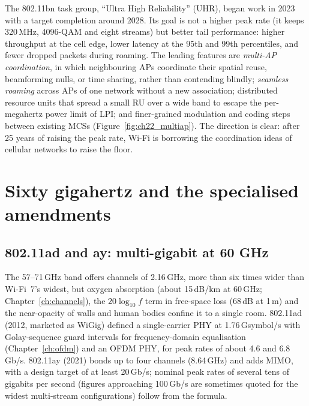 The 802.11bn task group, ``Ultra High Reliability'' (UHR), began work in 2023 with a target
completion around 2028. Its goal is not a higher peak rate (it keeps 320\,MHz, 4096-QAM and eight
streams) but better tail performance: higher throughput at the cell edge, lower latency at the 95th
and 99th percentiles, and fewer dropped packets during roaming. The leading features are
\emph{multi-AP coordination}, in which neighbouring APs coordinate their spatial reuse, beamforming
nulls, or time sharing, rather than contending blindly; \emph{seamless roaming} across APs of one
network without a new association; distributed resource units that spread a small RU over a wide
band to escape the per-megahertz power limit of LPI; and finer-grained modulation and coding steps
between existing MCSs (Figure~\ref{fig:ch22_multiap}). The direction is clear: after 25 years of raising the peak rate, Wi-Fi is
borrowing the coordination ideas of cellular networks to raise the floor.

\section{Sixty gigahertz and the specialised amendments}
\label{sec:ch22:special}

\subsection{802.11ad and ay: multi-gigabit at 60 GHz}

The 57--71\,GHz band offers channels of 2.16\,GHz, more than six times wider than Wi-Fi~7's widest,
but oxygen absorption (about 15\,dB/km at 60\,GHz; Chapter~\ref{ch:channels}), the $20\log_{10}f$
term in free-space loss (68\,dB at 1\,m) and the near-opacity of walls and human bodies confine it
to a single room. 802.11ad (2012, marketed as WiGig) defined a single-carrier PHY at
1.76\,Gsymbol/s with Golay-sequence guard intervals for frequency-domain equalisation
(Chapter~\ref{ch:ofdm}) and an OFDM PHY, for peak rates of about 4.6 and 6.8\,Gb/s. 802.11ay (2021)
bonds up to four channels (8.64\,GHz) and adds MIMO, with a design target of at least 20\,Gb/s;
nominal peak rates of several tens of gigabits per second (figures approaching 100\,Gb/s are
sometimes quoted for the widest multi-stream configurations) follow from the formula.

